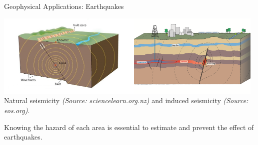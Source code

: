 \begin{frame}{Geophysical Applications: Earthquakes}

\vspace{-0.4cm}
\center\includegraphics[height=4cm]{Diapos/Intro/Figures/natural_seismicity}\includegraphics[height=4cm]{Diapos/Intro/Figures/induced_seismicity}\\

\vspace{-0.35cm}
\center\scriptsize{Natural seismicity  \textit{(Source: sciencelearn.org.nz)} and induced seismicity \textit{(Source: eos.org)}.}

\vspace{1cm}
\raggedright\normalsize{Knowing the hazard of each area is essential to estimate and prevent the effect of earthquakes.}
\end{frame} 


